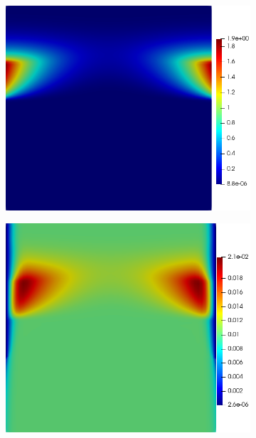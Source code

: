 \documentclass[11pt]{article}
\numberwithin{equation}{section}
\begin{document}
 \begin{figure}[h]
     \centering
     \begin{subfigure}[t]{0.31\textwidth}
     \includegraphics[width=\textwidth]{Figures/testpics/0.15ApartDMA24.png}
     \caption{}
     \label{fig:wup_DMA}
     \end{subfigure}
     \begin{subfigure}[t]{0.31\textwidth}
     \includegraphics[width=\textwidth]{Figures/testpics/0.15ApartZn24.png}

\end{subfigure}
\end{figure}
\end{document}
